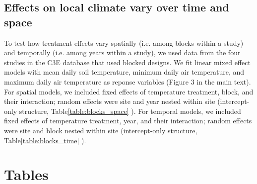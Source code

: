 \documentclass{article}
\begin{document}
\subsection* {Effects on local climate vary over time and space}
To test how treatment effects vary spatially (i.e. among blocks within a study) and temporally (i.e. among years within a study), we used data from the four studies in the C3E database that used blocked designs. We fit linear mixed effect models with mean daily soil temperature, minimum daily air temperature, and maximum daily air temperature as reponse variables (Figure 3 in the main text). For spatial models, we included fixed effects of temperature treatment, block, and their interaction; random effects were site and year nested within site (intercept-only structure, Table\ref{table:blocks_space}
).  For temporal models, we included fixed effects of temperature treatment, year, and their interaction; random effects were site and block nested within site (intercept-only structure, Table\ref{table:blocks_time}
). 



\clearpage


\section* {Tables}
\end{document}
